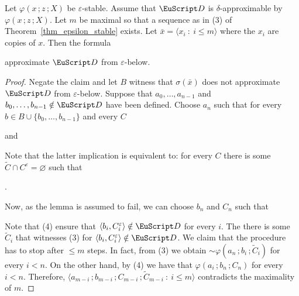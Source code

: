 \begin{lemma}
  Let $\varphi(x\,;z\,;X)$ be $\varepsilon$-stable.
  Assume that ${\EuScript D}$ is $\delta$-approximable by $\varphi(x\,;z\,;X)$.
  Let $m$ be maximal so that a sequence as in (3) of Theorem~\ref{thm_epsilon_stable} exists.
  Let $\bar x=\langle x_i\ :\ i\le m\rangle$ where the $x_i$ are copies of $x$.
  Then the formula\smallskip

  \smallskip

  approximate ${\EuScript D}$ from $\varepsilon$-below.
\end{lemma}

\begin{proof}
  Negate the claim and let $B$ witness that $\sigma(\bar x)$ does not approximate ${\EuScript D}$ from $\varepsilon$-below.
  Suppose that $a_0,\dots,a_{n-1}$ and $b_0,\dots,b_{n-1}\notin{\EuScript D}$ have been defined.
  Choose $a_n$ such that for every $b\in B\cup\{b_0,\dots,b_{n-1}\}$ and every $C$

  \quad and

  
  Note that the latter implication is equivalent to: for every $C$ there is some  $\tilde C\cap C^\varepsilon=\varnothing$ such that 
  
  .%

  Now, as the lemma is assumed to fail, we can choose $b_n$ and $C_n$ such that


  Note that (4) ensure that $\langle b_i,C_i^\varepsilon\rangle\notin{\EuScript D}$ for every $i$.
  The there is some $\tilde C_i$ that witnesses (3) for $\langle b_i,C_i^\varepsilon\rangle\notin{\EuScript D}$.
  We claim that the procedure has to stop after $\le m$ steps. 
  In fact, from (3) we obtain ${\sim}\varphi(a_n\,;b_i\,;\tilde C_i)$ for every $i<n$.
  On the other hand, by (4) we have that $\varphi(a_i\,;b_n\,;C_n)$ for every $i<n$.
  Therefore, $\langle a_{m-i}\,;b_{m-i}\,;C_{m-i}\,;\tilde C_{m-i}\ :\ i\le m\rangle$ contradicts the maximality of $m$.
\end{proof}
